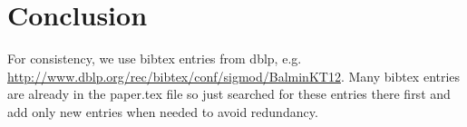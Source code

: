 %
%













\section{Conclusion}\label{sec:conclusion}
For consistency, we use bibtex entries from dblp, e.g. \url{http://www.dblp.org/rec/bibtex/conf/sigmod/BalminKT12}. Many bibtex entries are already in the paper.tex file so just searched for these entries there first and add only new entries when needed to avoid redundancy. 




